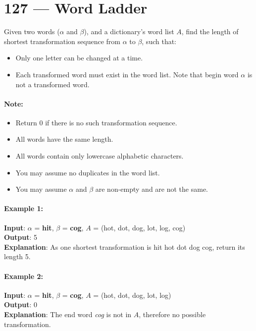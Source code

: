 \section{127 --- Word Ladder}
Given two words ($\alpha$ and $\beta$), and a dictionary's word list $A$, find the length of shortest transformation sequence from $\alpha$ to $\beta$, such that:
\begin{itemize}
\item Only one letter can be changed at a time.
\item Each transformed word must exist in the word list. Note that begin word $\alpha$ is not a transformed word.
\end{itemize}
\paragraph{Note:}
\begin{itemize}
\item Return 0 if there is no such transformation sequence.
\item All words have the same length.
\item All words contain only lowercase alphabetic characters.
\item You may assume no duplicates in the word list.
\item You may assume $\alpha$ and $\beta$ are non-empty and are not the same.
\end{itemize}
\paragraph{Example 1:}
\begin{flushleft}
\textbf{Input}: $\alpha$ = \textbf{hit}, $\beta$ = \textbf{cog}, $A$ = (hot, dot, dog, lot, log, cog)
\\
\textbf{Output}: 5
\\
\textbf{Explanation}: As one shortest transformation is hit \textrightarrow hot \textrightarrow dot \textrightarrow dog \textrightarrow cog, return its length 5.
\end{flushleft}
\paragraph{Example 2:}
\begin{flushleft}
\textbf{Input}: $\alpha$ = \textbf{hit},  $\beta$ = \textbf{cog}, $A$ = (hot, dot, dog, lot, log)
\\
\textbf{Output}: 0
\\
\textbf{Explanation}: The end word \textit{cog} is not in $A$, therefore no possible transformation.
\end{flushleft}

